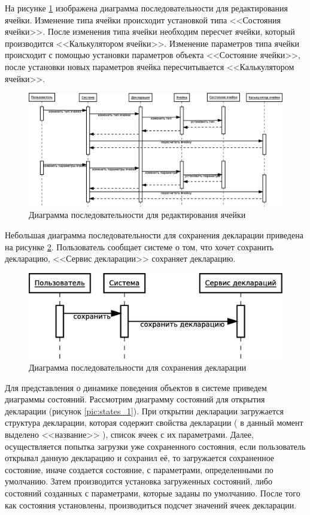 \documentclass[14pt,a4paper]{reportmod}
\begin{document}
На рисунке \ref{pic:sequence_4_} изображена диаграмма последовательности для редактирования ячейки. Изменение типа ячейки происходит установкой типа <<Состояния ячейки>>. После изменения типа ячейки необходим пересчет ячейки, который производится <<Калькулятором ячейки>>. Изменение параметров типа ячейки происходит с помощью установки параметров объекта <<Состояние ячейки>>, после установки новых параметров ячейка пересчитывается <<Калькулятором ячейки>>.

\begin{figure}
  \centering
  \includegraphics[scale=0.4]{uml/_sequence_2}
  \caption{Диаграмма последовательности для редактирования ячейки}
  \label{pic:sequence_4_}
\end{figure}

Небольшая диаграмма последовательности для сохранения декларации приведена на рисунке \ref{pic:sequence_5}. Пользователь сообщает системе о том, что хочет сохранить декларацию, <<Сервис декларации>> сохраняет декларацию.

\begin{figure}
  \centering
  \includegraphics[scale=0.4]{uml/_sequence_3}
  \caption{Диаграмма последовательности для сохранения декларации}
  \label{pic:sequence_5}
\end{figure}

Для представления о динамике поведения объектов в системе приведем диаграммы состояний. Рассмотрим диаграмму состояний для открытия декларации (рисунок \ref{pic:states_1}). При открытии декларации загружается структура декларации, которая содержит свойства декларации ( в данный момент выделено <<название>> ), список ячеек с их параметрами. Далее, осуществляется попытка загрузки уже сохраненного состояния, если пользователь открывал данную декларацию и сохранил её, то загружается сохраненное состояние, иначе создается состояние, с параметрами, определенными по умолчанию. Затем производится установка загруженных состояний, либо состояний созданных с параметрами, которые заданы по умолчанию. После того как состояния установлены, производиться подсчет значений ячеек декларации.
\end{document}
